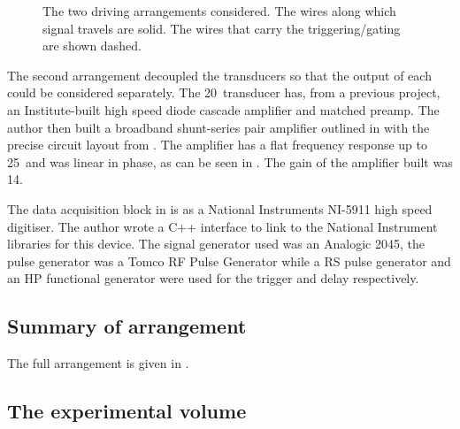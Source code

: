 \begin{centering}
\begin{figure}[h]%
   \hspace{.3in}
   \caption{
     The two driving arrangements considered.
     The wires along which signal travels are solid.
     The wires that carry the triggering/gating are shown dashed.
   }
   \label{fig:arrangements}
\end{figure}
\end{centering}

The second arrangement decoupled the transducers so that the output of each could be considered separately.
The 20\mega\hertz\ transducer has, from a previous project, an Institute-built high speed diode cascade amplifier
and matched preamp.
The author then built a  broadband  shunt-series pair amplifier outlined in \cite{Horowitz1980} with the precise circuit layout from \cite{amp}.
The amplifier has a flat frequency response  up to 25\mega\hertz\ and was linear in phase, as can be seen in .
The gain of the amplifier built was 14\deci\bel.


The data acquisition block in  is as a National Instruments NI-5911 high speed digitiser.
The author wrote a C++ interface  to link to the National Instrument libraries for this device.
The signal generator used was an Analogic 2045, 
the pulse generator was a Tomco RF Pulse Generator while a RS pulse generator and an 
HP functional generator were used for the trigger and delay respectively.


\subsection{Summary of arrangement}
The full arrangement is given in .





\subsection{The experimental volume}

